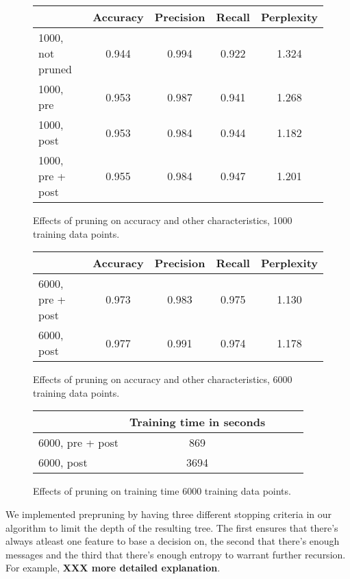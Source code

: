 \documentclass[a4paper,10pt]{article}
\newcommand{\XXX}[1]{{\bf XXX #1}}
\begin{document}
\begin{figure}
  \centering
\begin{tabular}{|l|c|c|c|c|}
\hline
 & Accuracy & Precision & Recall & Perplexity \\ \hline
1000, not pruned &  0.944 & 0.994 & 0.922 & 1.324 \\
1000, pre & 0.953 & 0.987 & 0.941 & 1.268 \\
1000, post & 0.953 & 0.984 &  0.944 & 1.182 \\
1000, pre + post &  0.955 & 0.984 & 0.947 & 1.201 \\
\hline
\end{tabular}
  \caption{Effects of pruning on accuracy and other characteristics,
    1000 training data points.}
  \label{fig:pruning} 
\end{figure}

\begin{figure}
  \centering
\begin{tabular}{|l|c|c|c|c|}
\hline
 & Accuracy & Precision & Recall & Perplexity \\ \hline
6000, pre + post & 0.973 & 0.983 & 0.975 & 1.130 \\
6000, post & 0.977 & 0.991 & 0.974 & 1.178 \\
\hline
\end{tabular}
  \caption{Effects of pruning on accuracy and other characteristics,
    6000 training data points.}
  \label{fig:pruning6000} 
\end{figure}


\begin{figure}
  \centering
\begin{tabular}{|l|c|c|c|c|}
\hline
 & Training time in seconds \\ \hline
6000, pre + post & 869 \\
6000, post & 3694 \\
\hline
\end{tabular}
\caption{Effects of pruning on training time 6000 training data points.}
  \label{fig:pruning6000-training-time} 
\end{figure}

We implemented prepruning by having three different stopping criteria in
our algorithm to limit the depth of the resulting tree.  The first ensures
that there's always atleast one feature to base a decision on, the second
that there's enough messages and the third that there's enough entropy to
warrant further recursion.  For example, \XXX{more detailed explanation}.
\end{document}
